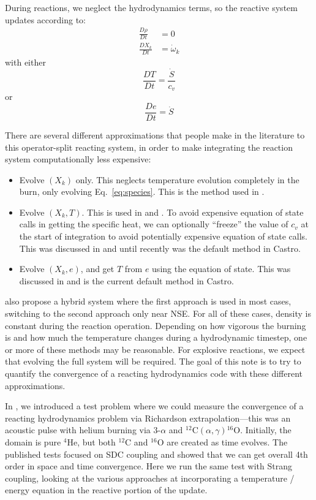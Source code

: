 \documentclass[times,preprint]{aastex63}
\newcommand{\castro}{{\sf Castro}}
\newcommand{\isotm}[2]{{}^{#2}\mathrm{#1}}
\newcommand{\omegadot}{\dot{\omega}}
\newcommand{\Sdot}{\dot{S}}
\newcommand{\MarginPar}[1]{\marginpar{\vskip-\baselineskip\raggedright\tiny\sffamily\hrule\smallskip{\color{red}#1}\par\smallskip\hrule}}
\begin{document}
During reactions, we neglect the hydrodynamics terms,
so the reactive system updates according to:
\begin{align}
\frac{D\rho}{Dt} &= 0 \\
\frac{DX_k}{Dt} &= \omegadot_k \label{eq:species}
\end{align}
with either
\begin{equation}
\frac{DT}{Dt} = \frac{\Sdot}{c_v}
\end{equation}
or
\begin{equation}
\frac{De}{Dt} = \Sdot
\end{equation}

There are several different approximations that people make in the
literature to this operator-split reacting system, in order to make
integrating the reaction system computationally less expensive:
\begin{itemize}
\item Evolve $(X_k)$ only.  This neglects temperature evolution
  completely in the burn, only evolving Eq.~\ref{eq:species}.  This is
  the method used in \citet{flash}. \MarginPar{other codes?}

\item Evolve $(X_k, T)$.   This is used in \cite{Pakmor:2012} and
  \cite{Garcia-Senz:2013}.  To avoid expensive equation of state calls
  in getting the specific heat, we can optionally ``freeze'' the value
  of $c_v$ at the start of integration to avoid potentially expensive
  equation of state calls.  This was discussed in \cite{Bell:2004} and
  until recently was the default method in \castro.

\item Evolve $(X_k, e)$, and get $T$ from $e$ using the equation of
  state.  This was discussed in \citet{fma} and is the current default
  method in \castro.
\end{itemize}
\cite{Raskin:2010} also propose a hybrid system where the first approach is
used in most cases, switching to the second approach only near NSE.
For all of these cases, density is constant during the reaction operation.
Depending on how vigorous the burning is and how much the temperature
changes during a hydrodynamic timestep, one or more of these
methods may be reasonable.  For explosive reactions, we expect
that evolving the full system will be required.  The goal of this
note is to try to quantify the convergence of a reacting hydrodynamics
code with these different approximations.

In \citet{castro_sdc}, we introduced a test problem where we could
measure the convergence of a reacting hydrodynamics problem via
Richardson extrapolation---this was an acoustic pulse with helium
burning via $3$-$\alpha$ and
$\isotm{C}{12}(\alpha,\gamma)\isotm{O}{16}$.  Initially, the domain is
pure $\isotm{He}{4}$, but both $\isotm{C}{12}$ and $\isotm{O}{16}$ are
created as time evolves.  The published tests focused on SDC coupling
and showed that we can get overall 4th order in space and time
convergence.  Here we run the same test with Strang coupling, looking
at the various approaches at incorporating a temperature / energy equation in
the reactive portion of the update.
\end{document}

